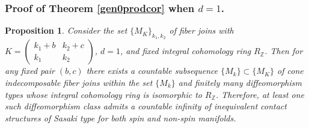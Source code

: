 \documentclass[12pt]{amsart}
\newtheorem{proposition}[theorem]{Proposition}
\def\bbz{{\mathbb Z}}
\begin{document}
\subsubsection{Proof of Theorem \ref{gen0prodcor} when $d=1$.}

\begin{proposition}\label{infcontman2}
Consider the set $\{M_K\}_{k_1,k_2}$ of  fiber joins with $K=\begin{pmatrix}
     k_1+b &k_2+c \\
     k_1 & k_2
\end{pmatrix}$, $d=1$,
and fixed integral cohomology ring $R_\bbz$. Then for any fixed pair $(b,c)$ there exists a countable subsequence $\{M_k\}\subset \{M_K\}$ of cone indecomposable fiber joins within the set $\{M_{k}\}$ and finitely many diffeomorphism types whose integral cohomology ring is isomorphic to $R_\bbz$. Therefore, at least one such diffeomorphism class admits a countable infinity of inequivalent contact structures of Sasaki type for both spin and non-spin manifolds.
\end{proposition}
\end{document}
